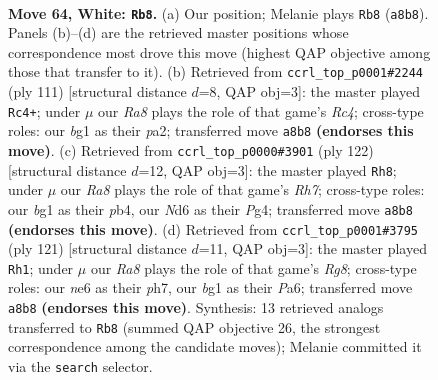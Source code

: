 \documentclass[11pt]{article}
\begin{document}
\clearpage

\begin{figure}[p]\centering
\begin{subfigure}{0.46\textwidth}\centering
\resizebox{\linewidth}{!}{%
\newchessgame
\chessboard[
  setfen={R7/7k/3Nn3/8/P7/7r/2K5/6b1 w - - 2 64},
  showmover=false,
  pgfstyle=straightmove, color=movearrow, markmove={a8-b8}
]}
\caption{}
\end{subfigure}\hfill
\begin{subfigure}{0.46\textwidth}\centering
\resizebox{\linewidth}{!}{%
\newchessgame
\chessboard[
  setfen={5R2/1k6/8/p1r5/5K2/8/P7/8 b - - 8 56},
  showmover=false,
  pgfstyle=straightmove, color=movearrow, markmove={c5-c4}
]}
\caption{}
\end{subfigure}
\\[4pt]
\begin{subfigure}{0.46\textwidth}\centering
\resizebox{\linewidth}{!}{%
\newchessgame
\chessboard[
  setfen={8/7R/2k5/6pP/1p4P1/4K3/2r5/8 w - - 0 62},
  showmover=false,
  pgfstyle=straightmove, color=movearrow, markmove={h7-h8}
]}
\caption{}
\end{subfigure}\hfill
\begin{subfigure}{0.46\textwidth}\centering
\resizebox{\linewidth}{!}{%
\newchessgame
\chessboard[
  setfen={2R2K2/7P/p7/p7/8/3k4/8/6r1 b - - 14 61},
  showmover=false,
  pgfstyle=straightmove, color=movearrow, markmove={g1-h1}
]}
\caption{}
\end{subfigure}
\caption{\textbf{Move 64, White: \texttt{Rb8}.} (a) Our position; Melanie plays \texttt{Rb8} (\texttt{a8b8}). Panels (b)--(d) are the retrieved master positions whose correspondence most drove this move (highest QAP objective among those that transfer to it). (b) Retrieved from \texttt{ccrl\_top\_p0001\#2244} (ply 111) [structural distance $d$=8, QAP obj=3]: the master played \texttt{Rc4+}; under $\mu$ our \emph{Ra8} plays the role of that game's \emph{Rc4}; cross-type roles: our \emph{b}g1 as their \emph{p}a2; transferred move \texttt{a8b8} \textbf{(endorses this move)}. (c) Retrieved from \texttt{ccrl\_top\_p0000\#3901} (ply 122) [structural distance $d$=12, QAP obj=3]: the master played \texttt{Rh8}; under $\mu$ our \emph{Ra8} plays the role of that game's \emph{Rh7}; cross-type roles: our \emph{b}g1 as their \emph{p}b4, our \emph{N}d6 as their \emph{P}g4; transferred move \texttt{a8b8} \textbf{(endorses this move)}. (d) Retrieved from \texttt{ccrl\_top\_p0001\#3795} (ply 121) [structural distance $d$=11, QAP obj=3]: the master played \texttt{Rh1}; under $\mu$ our \emph{Ra8} plays the role of that game's \emph{Rg8}; cross-type roles: our \emph{n}e6 as their \emph{p}h7, our \emph{b}g1 as their \emph{P}a6; transferred move \texttt{a8b8} \textbf{(endorses this move)}. Synthesis: 13 retrieved analogs transferred to \texttt{Rb8} (summed QAP objective 26, the strongest correspondence among the candidate moves); Melanie committed it via the \texttt{search} selector.}
\label{fig:thought-m126}
\end{figure}
\end{document}
